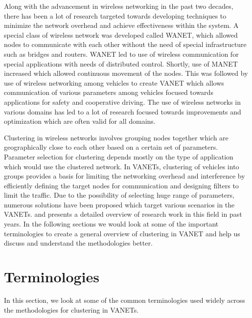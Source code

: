\documentclass[]{ccs-thesis}
\begin{document}
Along with the advancement in wireless networking in the past two decades, there has been a lot of research targeted
towards developing techniques to minimize the network overhead and achieve effectiveness within the system. A special
class of wireless network was developed called \ac{WANET}, which allowed nodes to communicate with each other without the need of
special infrastructure such as bridges and routers. \ac{WANET} led to use of wireless communication
for special applications with needs of distributed control. Shortly, use of \ac{MANET} increased which allowed
continuous movement of the nodes. This was followed by use of wireless networking among vehicles to create \ac{VANET}
which allows communication of various parameters among vehicles focused towards applications for safety and cooperative
driving. The use of wireless networks in various domains has led to a lot of research focused towards improvements
and optimization which are often valid for all domains.

Clustering in wireless networks involves grouping nodes together which are geographically close to each other based on a
certain set of parameters. Parameter selection for clustering depends mostly on the type of application which would use
the clustered network. In \ac{VANET}s, clustering of vehicles into groups provides a basis for limiting the networking
overhead and interference by efficiently defining the target nodes for communication and designing filters to limit the traffic.
Due to the possibility of selecting huge range of parameters, numerous solutions have been proposed which target various
scenarios in the \ac{VANET}s. \textcite{6256251} and \textcite{BALI2014134} presents a detailed overview of research work in this
field in past years. In the following sections we would look at some of the important terminologies to create
a general overview of clustering in \ac{VANET} and help us discuss and understand the methodologies better.

\section{Terminologies}

In this section, we look at some of the common terminologies used widely across the methodologies
for clustering in \ac{VANET}s.
\end{document}
